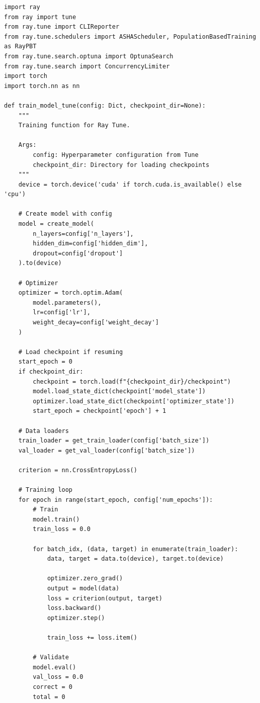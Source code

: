 \begin{lstlisting}[style=python, caption=Distributed HPO with Ray Tune]
import ray
from ray import tune
from ray.tune import CLIReporter
from ray.tune.schedulers import ASHAScheduler, PopulationBasedTraining as RayPBT
from ray.tune.search.optuna import OptunaSearch
from ray.tune.search import ConcurrencyLimiter
import torch
import torch.nn as nn

def train_model_tune(config: Dict, checkpoint_dir=None):
    """
    Training function for Ray Tune.

    Args:
        config: Hyperparameter configuration from Tune
        checkpoint_dir: Directory for loading checkpoints
    """
    device = torch.device('cuda' if torch.cuda.is_available() else 'cpu')

    # Create model with config
    model = create_model(
        n_layers=config['n_layers'],
        hidden_dim=config['hidden_dim'],
        dropout=config['dropout']
    ).to(device)

    # Optimizer
    optimizer = torch.optim.Adam(
        model.parameters(),
        lr=config['lr'],
        weight_decay=config['weight_decay']
    )

    # Load checkpoint if resuming
    start_epoch = 0
    if checkpoint_dir:
        checkpoint = torch.load(f"{checkpoint_dir}/checkpoint")
        model.load_state_dict(checkpoint['model_state'])
        optimizer.load_state_dict(checkpoint['optimizer_state'])
        start_epoch = checkpoint['epoch'] + 1

    # Data loaders
    train_loader = get_train_loader(config['batch_size'])
    val_loader = get_val_loader(config['batch_size'])

    criterion = nn.CrossEntropyLoss()

    # Training loop
    for epoch in range(start_epoch, config['num_epochs']):
        # Train
        model.train()
        train_loss = 0.0

        for batch_idx, (data, target) in enumerate(train_loader):
            data, target = data.to(device), target.to(device)

            optimizer.zero_grad()
            output = model(data)
            loss = criterion(output, target)
            loss.backward()
            optimizer.step()

            train_loss += loss.item()

        # Validate
        model.eval()
        val_loss = 0.0
        correct = 0
        total = 0


\end{lstlisting}
